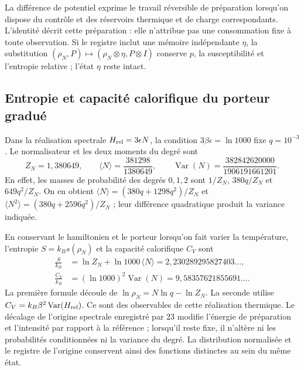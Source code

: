 La différence de potentiel exprime le travail réversible de préparation
lorsqu’on dispose du contrôle et des réservoirs thermique et de charge
correspondants. L’identité décrit cette préparation : elle n’attribue pas une
consommation fixe à toute observation. Si le registre inclut une mémoire
indépendante $\eta$, la substitution
$(\rho_N,P)\mapsto(\rho_N\otimes\eta,P\otimes I)$ conserve $p$, la
susceptibilité et l’entropie relative ; l’état $\eta$ reste intact.

\subsection{Entropie et capacité calorifique du porteur gradué}
\label{sec:termica-ejemplo-calorifico-recuperado}

Dans la réalisation spectrale $H_{\rm rel}=3\epsilon N$, la condition
$3\beta\epsilon=\ln1000$ fixe $q=10^{-3}$. Le normalisateur et les deux
moments du degré sont
\[
 Z_N=1{,}380649,\qquad
 \langle N\rangle=\frac{381298}{1380649},\qquad
 \operatorname{Var}(N)=\frac{382842620000}{1906191661201}.
\]
En effet, les masses de probabilité des degrés $0,1,2$ sont
$1/Z_N$, $380q/Z_N$ et $649q^2/Z_N$. On en obtient
$\langle N\rangle=(380q+1298q^2)/Z_N$ et
$\langle N^2\rangle=(380q+2596q^2)/Z_N$ ; leur différence quadratique
produit la variance indiquée.

En conservant le hamiltonien et le porteur lorsqu’on fait varier la température,
l’entropie $S=k_Bs(\rho_N)$ et la capacité calorifique $C_V$ sont
\begin{align*}
 \frac{S}{k_B}
 &=\ln Z_N+\ln1000\,\langle N\rangle
   =2{,}230289295827403\ldots,\\
 \frac{C_V}{k_B}
 &=(\ln1000)^2\operatorname{Var}(N)
   =9{,}58357621855691\ldots.
\end{align*}
La première formule découle de $\ln\rho_N=N\ln q-\ln Z_N$.
La seconde utilise $C_V=k_B\beta^2\operatorname{Var}(H_{\rm rel})$.
Ce sont des observables de cette réalisation thermique. Le décalage de l’origine
spectrale enregistré par $23$ modifie l’énergie de préparation et
l’intensité par rapport à la référence ; lorsqu’il reste fixe, il n’altère ni les
probabilités conditionnées ni la variance du degré. La distribution
normalisée et le registre de l’origine conservent ainsi des fonctions distinctes
au sein du même état.
